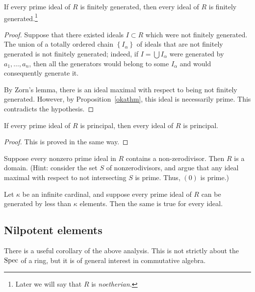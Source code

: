 \begin{corollary}[Cohen]
If every prime ideal of $R$ is finitely generated, then every ideal of $R$ is
finitely generated.\footnote{Later we will say that $R$ is \emph{noetherian.}} 
\end{corollary} 

\begin{proof} 
Suppose that there existed ideals $I \subset R$ which were not finitely
generated.
The union of a totally ordered chain $\left\{I_\alpha\right\}$ of ideals that are not finitely generated is not finitely
generated; indeed, if $I = \bigcup I_\alpha$ were generated by $a_1, \dots,
a_n$, then all the generators would belong to some $I_\alpha $ and would
consequently generate it.

By Zorn's lemma, there is an ideal maximal with respect to being not finitely
generated. However, by Proposition~\ref{okathm}, this ideal is necessarily
prime. This contradicts the hypothesis.
\end{proof} 

\begin{corollary} 
If every prime ideal of $R$ is principal, then every ideal of $R$ is principal.
\end{corollary} 
\begin{proof} 
This is proved in the same way.
\end{proof} 

\begin{exercise} 
Suppose every nonzero prime ideal in $R$ contains a non-zerodivisor. Then $R$
is a domain. (Hint: consider the set $S$ of nonzerodivisors, and argue that
any ideal maximal with respect to not intersecting $S$ is prime. Thus, $(0)$
is prime.)
\end{exercise} 

\begin{exercise} 
Let $\kappa$ be an infinite cardinal, and suppose every prime ideal of $R$ can
be generated by less than $\kappa$ elements. Then the same is true for every
ideal. 
\end{exercise} 

\subsection{Nilpotent elements}

There is a useful corollary of the above analysis. This is not strictly about
the $\operatorname{Spec}$ of a ring, but it is of general interest in commutative algebra. 

